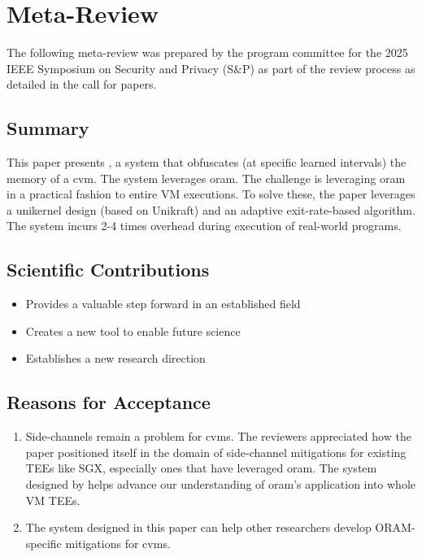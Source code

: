 \newpage %
\glsresetall

\appendices %


\nobalance
\section{Meta-Review}

The following meta-review was prepared by the program committee for the 2025 IEEE Symposium on Security and Privacy (S\&P) as part of the review process as detailed in the call for papers.

\subsection{Summary}

This paper presents \thename, a system that obfuscates (at specific learned intervals) the memory of a \gls{cvm}. The system leverages \gls{oram}. The challenge is leveraging \gls{oram} in a practical fashion to entire VM executions. To solve these, the paper leverages a unikernel design (based on Unikraft) and an adaptive exit-rate-based algorithm. The system incurs 2-4 times overhead during execution of real-world programs.



\subsection{Scientific Contributions}
\begin{itemize}
\item Provides a valuable step forward in an established field
\item Creates a new tool to enable future science
\item Establishes a new research direction
\end{itemize}

\subsection{Reasons for Acceptance}
\begin{enumerate}
\item Side-channels remain a problem for \glspl{cvm}. The reviewers appreciated how the paper positioned itself in the domain of side-channel mitigations for existing TEEs like SGX, especially ones that have leveraged \gls{oram}. The system designed by \thename helps advance our understanding of \gls{oram}'s application into whole VM TEEs.
\item The system designed in this paper can help other researchers develop ORAM-specific mitigations for \glspl{cvm}.
\end{enumerate}

